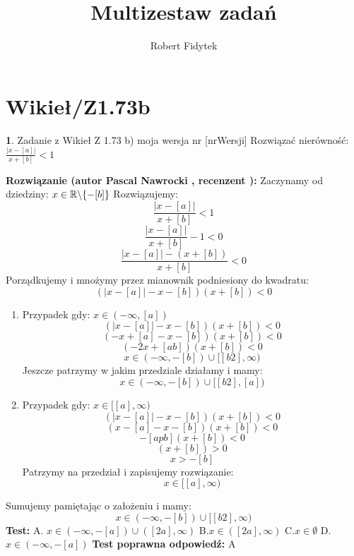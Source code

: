 \documentclass[12pt, a4paper]{article}
\title{Multizestaw zadań}
\author{Robert Fidytek}
\date{}
\theoremstyle{definition} %
\newtheorem{zad}{}
\newcommand{\kategoria}[1]{\section{#1}} %
\newcommand{\zadStart}[1]{\begin{zad}#1\newline} %
\newcommand{\zadStop}{\end{zad}}   %
\newcommand{\rozwStart}[2]{\noindent \textbf{Rozwiązanie (autor #1 , recenzent #2): }\newline} %
\newcommand{\odpStop}{\newline}                                             %
\newcommand{\testStart}{\noindent \textbf{Test:}\newline} %
\newcommand{\testStop}{\newline} %
\newcommand{\kluczStart}{\noindent \textbf{Test poprawna odpowiedź:}\newline} %
\newcommand{\kluczStop}{\newline} %
\begin{document}
\maketitle


\kategoria{Wikieł/Z1.73b}
\zadStart{Zadanie z Wikieł Z 1.73 b) moja wersja nr [nrWersji]}
Rozwiązać nierówność: $\frac{|x-[a]|}{x+[b]}<1$
\zadStop
\rozwStart{Pascal Nawrocki}{}
Zaczynamy od dziedziny: $x\in\mathbb{R}\symbol{92}\{-[b]\}$
Rozwiązujemy:
$$\frac{|x-[a]|}{x+[b]}<1$$
$$\frac{|x-[a]|}{x+[b]}-1<0$$
$$\frac{|x-[a]|-(x+[b])}{x+[b]}<0$$
Porządkujemy i mnożymy przez mianownik podniesiony do kwadratu:
$$(|x-[a]|-x-[b])(x+[b])<0$$
\begin{enumerate}
\item Przypadek gdy: $x\in(-\infty,[a])$
$$(|x-[a]|-x-[b])(x+[b])<0$$
$$(-x+[a]-x-[b])(x+[b])<0$$
$$(-2x+[ab])(x+[b])<0$$
$$x\in(-\infty,-[b])\cup[[b2],\infty)$$
Jeszcze patrzymy w jakim przedziale działamy i mamy:
$$x\in(-\infty,-[b])\cup[[b2],[a])$$
\item Przypadek gdy: $x\in[[a],\infty)$
$$(|x-[a]|-x-[b])(x+[b])<0$$
$$(x-[a]-x-[b])(x+[b])<0$$
$$-[apb](x+[b])<0$$
$$(x+[b])>0$$
$$x>-[b]$$
Patrzymy na przedział i zapisujemy rozwiązanie:
$$x\in[[a],\infty)$$
\end{enumerate}
Sumujemy pamiętając o założeniu i mamy:
$$x\in(-\infty,-[b])\cup[[b2],\infty)$$
\odpStop
\testStart
A. $x\in(-\infty,-[a])\cup([2a],\infty)$
B.$x\in([2a],\infty)$
C.$x\in\emptyset$
D.$x\in(-\infty,-[a])$
\testStop
\kluczStart
A
\kluczStop
\end{document}
